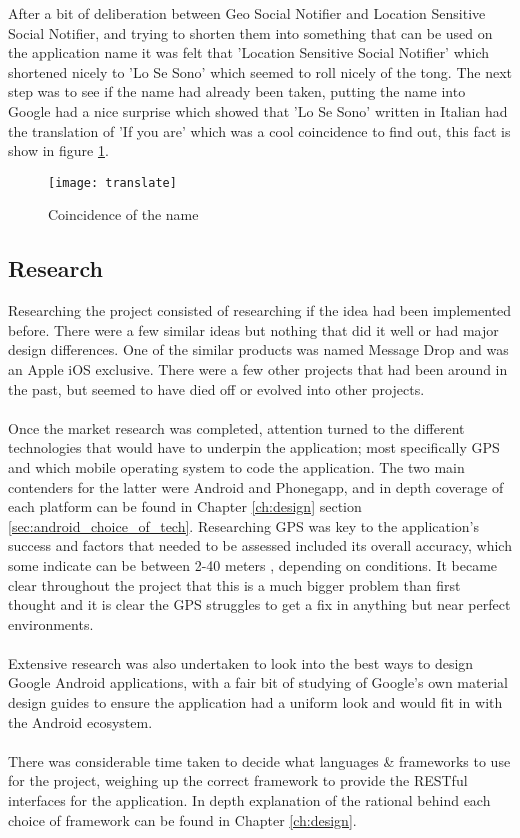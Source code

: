 \noindent
After a bit of deliberation between Geo Social Notifier and Location Sensitive Social Notifier, and trying to shorten them into something that can be used on the application name it was felt that 'Location Sensitive Social Notifier' which shortened nicely to 'Lo Se Sono' which seemed to roll nicely of the tong. The next step was to see if the name had already been taken, putting the name into Google had a nice surprise which showed that 'Lo Se Sono' written in Italian had the translation of 'If you are' which was a cool coincidence to find out, this fact is show in figure \ref{fig:google_translate}.

\begin{figure}[H]
    \centering
    \texttt{[image: translate]}
    \caption{Coincidence of the name}
    \label{fig:google_translate}
\end{figure} 

\subsection{Research}

Researching the project consisted of researching if the idea had been implemented before. There were a few similar ideas but nothing that did it well or had major design differences. One of the similar products was named Message Drop \cite{dmt:dropmessageteam:2015:online} and was an Apple iOS exclusive. There were a few other projects that had been around in the past, but seemed to have died off or evolved into other projects.\\
\\
Once the market research was completed, attention turned to the different technologies that would have to underpin the application; most specifically GPS and which mobile operating system to code the application. The two main contenders for the latter were Android and Phonegapp, and in depth coverage of each platform can be found in Chapter \ref{ch:design} section \ref{sec:android_choice_of_tech}. Researching GPS was key to the application's success and factors that needed to be assessed included its overall accuracy, which some indicate can be between 2-40 meters \cite{DevdattaTengshe:gpsacuracy:2012:online}, depending on conditions. It became clear throughout the project that this is a much bigger problem than first thought and it is clear the GPS struggles to get a fix in anything but near perfect environments.\\
\\
Extensive research was also undertaken to look into the best ways to design Google Android applications, with a fair bit of studying of Google's own material design guides to ensure the application had a uniform look and would fit in with the Android ecosystem.\\
\\
There was considerable time taken to decide what languages \& frameworks to use for the project, weighing up the correct framework to provide the RESTful interfaces for the application. In depth explanation of the rational behind each choice of framework can be found in Chapter \ref{ch:design}.

